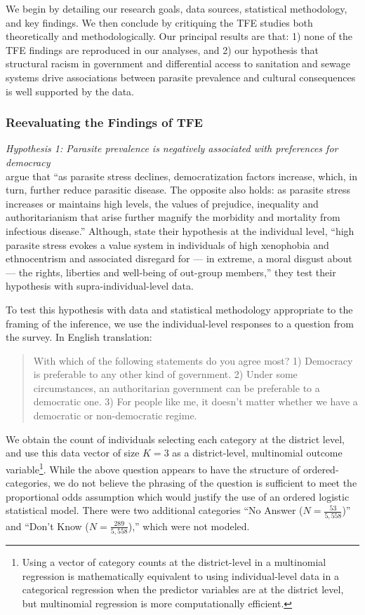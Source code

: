 \documentclass[12pt]{article}
\begin{document}
	We begin by detailing our research goals, data sources, statistical methodology, and key findings. We then conclude by critiquing the TFE studies both theoretically and methodologically. Our principal results are that: 1) none of the TFE findings are reproduced in our analyses, and 2) our hypothesis that structural racism in government and differential access to sanitation and sewage systems drive associations between parasite prevalence and cultural consequences is well supported by the data.

\subsubsection{Reevaluating the Findings of TFE} 
\noindent\textit{Hypothesis 1: Parasite prevalence is negatively associated with preferences for democracy}\\[12pt]
 \citet[pg117-118]{Thornhill2009} argue that ``as parasite stress declines, democratization factors increase, which, in turn, further reduce parasitic disease. The opposite also holds: as parasite stress increases or maintains high levels, the values of prejudice, inequality and authoritarianism that arise further magnify the morbidity and mortality from infectious disease.'' Although, \citet[pg117]{Thornhill2009}  state their hypothesis at the individual level, ``high parasite stress evokes a value system in individuals of high xenophobia and ethnocentrism and associated disregard for — in extreme, a moral disgust about — the rights, liberties and well-being of out-group members,'' they test their hypothesis with supra-individual-level data.  
 
 To test this hypothesis with data and statistical methodology appropriate to the framing of the inference, we use the individual-level responses to a question from the \citet{LB2008} survey.  In English translation:
\begin{quote}
\small
With which of the following statements do you agree most?
1) Democracy is preferable to any other kind of government.
2) Under some circumstances, an authoritarian government can be preferable to a democratic one.
3) For people like me, it doesn't matter whether we have a democratic or non-democratic regime.
     \end{quote}

We obtain the count of individuals selecting each category at the district level, and use this data vector of size $K=3$ as a district-level, multinomial outcome variable\footnote{Using a vector of category counts at the district-level in a multinomial regression is mathematically equivalent to using individual-level data in a categorical regression when the predictor variables are at the district level, but multinomial regression is more computationally efficient.}.  While the above question appears to have the structure of ordered-categories, we do not believe the phrasing of the question is sufficient to meet the proportional odds assumption which would justify the use of an ordered logistic statistical model. There were two additional categories ``No Answer ($N=\frac{53}{5,558}$)'' and ``Don't Know ($N=\frac{289}{5,558}$),'' which were not modeled. \\
\end{document}
